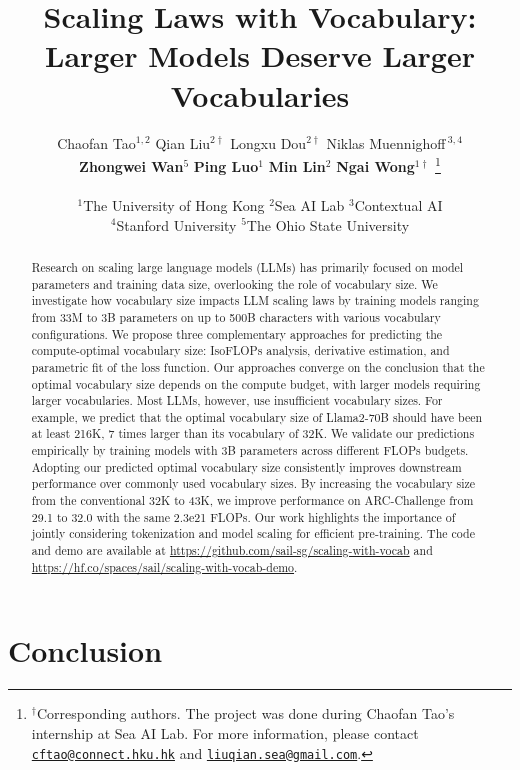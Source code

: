\documentclass{article}
\title{Scaling Laws with Vocabulary:\\Larger Models Deserve Larger Vocabularies}
\author{
Chaofan Tao$^{1,2}$ \quad
Qian Liu$^{2\dagger}$ \quad
Longxu Dou$^{2\dagger}$ \quad
Niklas Muennighoff$\,^{3,4}$\\
\textbf{Zhongwei Wan}$^5$ \quad
\textbf{Ping Luo}$^1$ \quad
\textbf{Min Lin}$^2$ \quad
\textbf{Ngai Wong}$^{1\dagger}$
\thanks{$^\dagger$Corresponding authors. The project was done during Chaofan Tao's internship at Sea AI Lab. For more information, please contact \href{mailto:cftao@connect.hku.hk}{\texttt{cftao@connect.hku.hk}} and \href{mailto:liuqian.sea@gmail.com}{\texttt{liuqian.sea@gmail.com}}.}\\ \\
$^1$The University of Hong Kong \quad
$^2$Sea AI Lab \quad
$^3$Contextual AI\\
$^4$Stanford University \quad
$^5$The Ohio State University\\
}
\begin{document}
\maketitle

\begin{abstract}
Research on scaling large language models (LLMs) has primarily focused on model parameters and training data size, overlooking the role of vocabulary size. We investigate how vocabulary size impacts LLM scaling laws by training models ranging from 33M to 3B parameters on up to 500B characters with various vocabulary configurations. We propose three complementary approaches for predicting the compute-optimal vocabulary size: IsoFLOPs analysis, derivative estimation, and parametric fit of the loss function.
Our approaches converge on the conclusion that the optimal vocabulary size depends on the compute budget, with larger models requiring larger vocabularies.
Most LLMs, however, use insufficient vocabulary sizes.
For example, we predict that the optimal vocabulary size of Llama2-70B should have been at least 216K, 7 times larger than its vocabulary of 32K. We validate our predictions empirically by training models with 3B parameters across different FLOPs budgets. Adopting our predicted optimal vocabulary size consistently improves downstream performance over commonly used vocabulary sizes. By increasing the vocabulary size from the conventional 32K to 43K, we improve performance on ARC-Challenge from 29.1 to 32.0 with the same 2.3e21 FLOPs. 
Our work highlights the importance of jointly considering tokenization and model scaling for efficient pre-training. 
The code and demo are available at \url{https://github.com/sail-sg/scaling-with-vocab} and \url{https://hf.co/spaces/sail/scaling-with-vocab-demo}.
\end{abstract}











\section{Conclusion}
\end{document}
